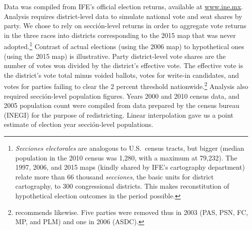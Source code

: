 \documentclass[letter,12pt]{article}
\begin{document}
Data was compiled from IFE's official election returns, available at \url{www.ine.mx}. Analysis requires district-level data to simulate national vote and seat shares by party. We chose to rely on secci\'on-level returns in order to aggregate vote returns in the three races into districts corresponding to the 2015 map that was never adopted.\footnote{\emph{Secciones electorales} are analogous to U.S.\ census tracts, but bigger (median population in the 2010 census was 1,280, with a maximum at 79,232). The 1997, 2006, and 2015 maps (kindly shared by IFE's cartography department) relate more than 66 thousand \emph{secciones}, the basic units for district cartography, to 300 congressional districts. This makes reconstitution of hypothetical election outcomes in the period possible.} Contrast of actual elections (using the 2006 map) to hypothetical ones (using the 2015 map) is illustrative. Party district-level vote shares are the number of votes won divided by the district's effective vote. The effective vote is the district's vote total minus voided ballots, votes for write-in candidates, and votes for parties failing to clear the 2 percent threshold nationwide.\footnote{\citet[][:fn. 4]{linzerSeatVoteElasticity2012} recommends likewise. Five parties were removed thus in 2003 (PAS, PSN, FC, MP, and PLM) and one in 2006 (ASDC).} Analysis also required secci\'on-level population figures. Years 2000 and 2010 census data, and 2005 population count were compiled from data prepared by the census bureau (INEGI) for the purpose of redistricting. Linear interpolation gave us a point estimate of election year secci\'on-level populations. 
\end{document}
